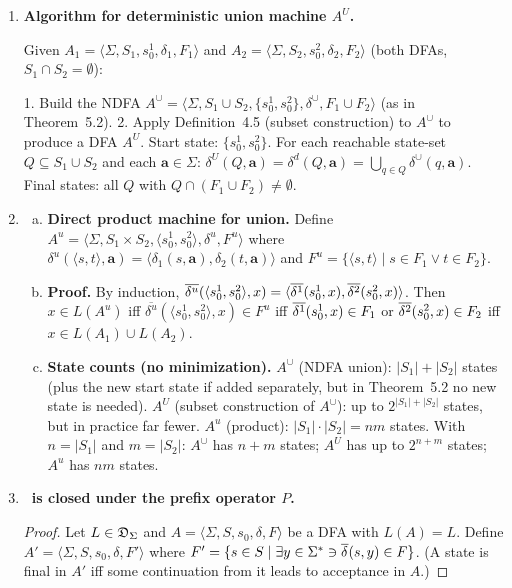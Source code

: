 \begin{enumerate}[{5.}1. ]
\item \textbf{Algorithm for deterministic union machine $A^U$.}

Given $A_1=\langle\Sigma,S_1,s^1_0,\delta_1,F_1\rangle$ and $A_2=\langle\Sigma,S_2,s^2_0,\delta_2,F_2\rangle$ (both DFAs, $S_1\cap S_2=\emptyset$):

1.  Build the NDFA $A^\cup=\langle\Sigma,S_1\cup S_2,\{s^1_0,s^2_0\},\delta^\cup,F_1\cup F_2\rangle$
    (as in Theorem~5.2).
2.  Apply Definition~4.5 (subset construction) to $A^\cup$ to produce a DFA $A^U$.
    Start state: $\{s^1_0,s^2_0\}$.
    For each reachable state-set $Q\subseteq S_1\cup S_2$ and each $\pmb{a}\in\Sigma$:
    $\delta^U(Q,\pmb{a})=\delta^d(Q,\pmb{a})=\bigcup_{q\in Q}\delta^\cup(q,\pmb{a})$.
    Final states: all $Q$ with $Q\cap(F_1\cup F_2)\neq\emptyset$.

\item \begin{enumerate}[(a)]
  \item \textbf{Direct product machine for union.}  Define
  $A^u=\langle\Sigma,S_1\times S_2,\langle s^1_0,s^2_0\rangle,\delta^u,F^u\rangle$ where
  $\delta^u(\langle s,t\rangle,\pmb{a})=\langle\delta_1(s,\pmb{a}),\delta_2(t,\pmb{a})\rangle$
  and $F^u=\{\langle s,t\rangle\mid s\in F_1\vee t\in F_2\}$.

  \item \textbf{Proof.}  By induction, $\overline{\delta^u}(\langle s^1_0,s^2_0\rangle,x)
  =\langle\overline{\delta^{1}}(s^1_0,x),\overline{\delta^{2}}(s^2_0,x)\rangle$.
  Then $x\in L(A^u)$ iff $\overline{\delta^u}(\langle s^1_0,s^2_0\rangle,x)\in F^u$
  iff $\overline{\delta^{1}}(s^1_0,x)\in F_1$ or $\overline{\delta^{2}}(s^2_0,x)\in F_2$
  iff $x\in L(A_1)\cup L(A_2)$.

  \item \textbf{State counts (no minimization).}
  $A^\cup$ (NDFA union): $|S_1|+|S_2|$ states (plus the new start state if added separately, but in Theorem~5.2 no new state is needed).
  $A^U$ (subset construction of $A^\cup$): up to $2^{|S_1|+|S_2|}$ states, but in practice far fewer.
  $A^u$ (product): $|S_1|\cdot|S_2|=nm$ states.
  With $n=|S_1|$ and $m=|S_2|$: $A^\cup$ has $n+m$ states; $A^U$ has up to $2^{n+m}$ states; $A^u$ has $nm$ states.
\end{enumerate}

\item \textbf{\DSIG\ is closed under the prefix operator $P$.}

\begin{proof}
Let $L\in\mathfrak{D}_\Sigma$ and $A=\langle\Sigma,S,s_0,\delta,F\rangle$ be a DFA with $L(A)=L$.
Define $A'=\langle\Sigma,S,s_0,\delta,F'\rangle$ where
$F'=\{s\in S\mid\exists y\in\Sigma^*\ni\overline{\delta^{}}(s,y)\in F\}$.
(A state is final in $A'$ iff some continuation from it leads to acceptance in $A$.)


\end{proof}
\end{enumerate}

